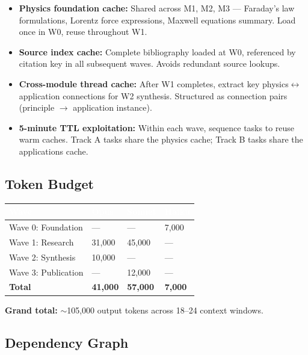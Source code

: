\documentclass[11pt,letterpaper]{article}
\newcommand{\tableheader}[1]{\textbf{\sffamily\textcolor{white}{#1}}}
\begin{document}
\begin{itemize}[leftmargin=2em]
\item \textbf{Physics foundation cache:} Shared across M1, M2, M3 --- Faraday's law formulations, Lorentz force expressions, Maxwell equations summary. Load once in W0, reuse throughout W1.
\item \textbf{Source index cache:} Complete bibliography loaded at W0, referenced by citation key in all subsequent waves. Avoids redundant source lookups.
\item \textbf{Cross-module thread cache:} After W1 completes, extract key physics$\leftrightarrow$application connections for W2 synthesis. Structured as connection pairs (principle $\rightarrow$ application instance).
\item \textbf{5-minute TTL exploitation:} Within each wave, sequence tasks to reuse warm caches. Track A tasks share the physics cache; Track B tasks share the applications cache.
\end{itemize}

\subsection{Token Budget}

\begin{center}
\begin{tabularx}{\textwidth}{L{4cm}C{2cm}C{2cm}C{2cm}}
\toprule
{}
\tableheader{Wave} & \tableheader{Opus} & \tableheader{Sonnet} & \tableheader{Haiku} \\
\midrule
Wave 0: Foundation & --- & --- & 7,000 \\
Wave 1: Research & 31,000 & 45,000 & --- \\
Wave 2: Synthesis & 10,000 & --- & --- \\
Wave 3: Publication & --- & 12,000 & --- \\
\midrule
\textbf{Total} & \textbf{41,000} & \textbf{57,000} & \textbf{7,000} \\
\bottomrule
\end{tabularx}
\end{center}

\textbf{Grand total:} $\sim$105,000 output tokens across 18--24 context windows.

\subsection{Dependency Graph}
\end{document}
